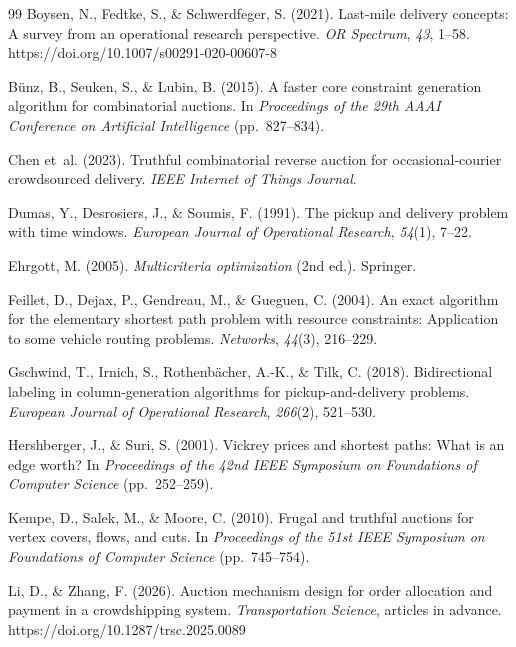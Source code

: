 \begin{singlespace}
\begin{thebibliography}{99}
Boysen, N., Fedtke, S., \& Schwerdfeger, S. (2021). Last-mile delivery
concepts: A survey from an operational research perspective. \emph{OR
Spectrum}, \emph{43}, 1--58. https://doi.org/10.1007/s00291-020-00607-8

B{\"u}nz, B., Seuken, S., \& Lubin, B. (2015). A faster core constraint
generation algorithm for combinatorial auctions. In \emph{Proceedings of
the 29th AAAI Conference on Artificial Intelligence} (pp.~827--834).

Chen et~al. (2023). Truthful combinatorial reverse auction for
occasional-courier crowdsourced delivery. \emph{IEEE Internet of Things
Journal}. %

Dumas, Y., Desrosiers, J., \& Soumis, F. (1991). The pickup and delivery
problem with time windows. \emph{European Journal of Operational Research},
\emph{54}(1), 7--22.

Ehrgott, M. (2005). \emph{Multicriteria optimization} (2nd ed.). Springer.

Feillet, D., Dejax, P., Gendreau, M., \& Gueguen, C. (2004). An exact
algorithm for the elementary shortest path problem with resource
constraints: Application to some vehicle routing problems.
\emph{Networks}, \emph{44}(3), 216--229. %

Gschwind, T., Irnich, S., Rothenb{\"a}cher, A.-K., \& Tilk, C. (2018).
Bidirectional labeling in column-generation algorithms for
pickup-and-delivery problems. \emph{European Journal of Operational
Research}, \emph{266}(2), 521--530.

Hershberger, J., \& Suri, S. (2001). Vickrey prices and shortest paths: What
is an edge worth? In \emph{Proceedings of the 42nd IEEE Symposium on
Foundations of Computer Science} (pp.~252--259).

Kempe, D., Salek, M., \& Moore, C. (2010). Frugal and truthful auctions for
vertex covers, flows, and cuts. In \emph{Proceedings of the 51st IEEE
Symposium on Foundations of Computer Science} (pp.~745--754). %

Li, D., \& Zhang, F. (2026). Auction mechanism design for order allocation
and payment in a crowdshipping system. \emph{Transportation Science},
articles in advance. https://doi.org/10.1287/trsc.2025.0089


\end{thebibliography}
\end{singlespace}
